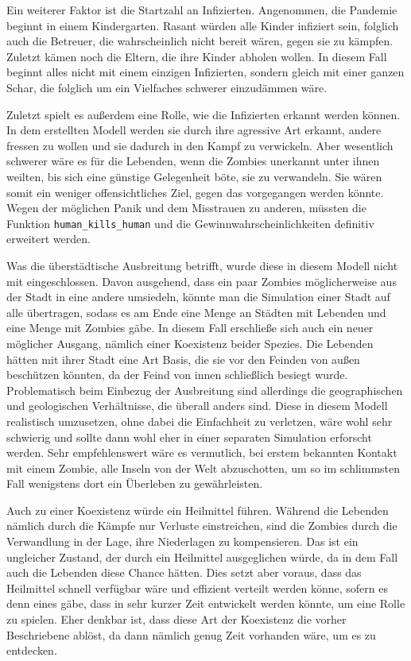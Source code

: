     Ein weiterer Faktor ist die Startzahl an Infizierten. Angenommen, die Pandemie beginnt in einem Kindergarten. Rasant würden alle Kinder infiziert sein, folglich auch die Betreuer, die wahrscheinlich nicht bereit wären, gegen sie zu kämpfen. Zuletzt kämen noch die Eltern, die ihre Kinder abholen wollen. In diesem Fall beginnt alles nicht mit einem einzigen Infizierten, sondern gleich mit einer ganzen Schar, die folglich um ein Vielfaches schwerer einzudämmen wäre.

    Zuletzt spielt es außerdem eine Rolle, wie die Infizierten erkannt werden können. In dem erstellten Modell werden sie durch ihre agressive Art erkannt, andere fressen zu wollen und sie dadurch in den Kampf zu verwickeln. Aber wesentlich schwerer wäre es für die Lebenden, wenn die Zombies unerkannt unter ihnen weilten, bis sich eine günstige Gelegenheit böte, sie zu verwandeln. Sie wären somit ein weniger offensichtliches Ziel, gegen das vorgegangen werden könnte. Wegen der möglichen Panik und dem Misstrauen zu anderen, müssten die Funktion \texttt{human\_kills\_human} und die Gewinnwahrscheinlichkeiten definitiv erweitert werden.

    Was die überstädtische Ausbreitung betrifft, wurde diese in diesem Modell nicht mit eingeschlossen. Davon ausgehend, dass ein paar Zombies möglicherweise aus der Stadt in eine andere umsiedeln, könnte man die Simulation einer Stadt auf alle übertragen, sodass es am Ende eine Menge an Städten mit Lebenden und eine Menge mit Zombies gäbe. In diesem Fall erschließe sich auch ein neuer möglicher Ausgang, nämlich einer Koexistenz beider Spezies. Die Lebenden hätten mit ihrer Stadt eine Art Basis, die sie vor den Feinden von außen beschützen könnten, da der Feind von innen schließlich besiegt wurde. Problematisch beim Einbezug der Ausbreitung sind allerdings die geographischen und geologischen Verhältnisse, die überall anders sind. Diese in diesem Modell realistisch umzusetzen, ohne dabei die Einfachheit zu verletzen, wäre wohl sehr schwierig und sollte dann wohl eher in einer separaten Simulation erforscht werden. Sehr empfehlenswert wäre es vermutlich, bei erstem bekannten Kontakt mit einem Zombie, alle Inseln von der Welt abzuschotten, um so im schlimmsten Fall wenigstens dort ein Überleben zu gewährleisten.

    Auch zu einer Koexistenz würde ein Heilmittel führen. Während die Lebenden nämlich durch die Kämpfe nur Verluste einstreichen, sind die Zombies durch die Verwandlung in der Lage, ihre Niederlagen zu kompensieren. Das ist ein ungleicher Zustand, der durch ein Heilmittel ausgeglichen würde, da in dem Fall auch die Lebenden diese Chance hätten. Dies setzt aber voraus, dass das Heilmittel schnell verfügbar wäre und effizient verteilt werden könne, sofern es denn eines gäbe, dass in sehr kurzer Zeit entwickelt werden könnte, um eine Rolle zu spielen. Eher denkbar ist, dass diese Art der Koexistenz die vorher Beschriebene ablöst, da dann nämlich genug Zeit vorhanden wäre, um es zu entdecken.

